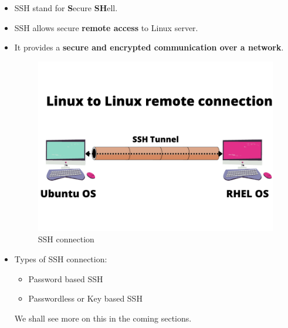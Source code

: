\setlength{\columnsep}{3pt}
\begin{flushleft}

\bigskip

\begin{itemize}
	\item SSH stand for \textbf{S}ecure \textbf{SH}ell.
	\item SSH allows secure \textbf{remote access} to Linux server.
	\item It provides a \textbf{secure and encrypted communication over a network}.
	
	\begin{figure}[h!]
		\centering
		\includegraphics[scale=0.45]{content/chapter19/images/ssh.png}
			\caption{SSH connection}
		\label{fig:boot1}
	\end{figure}

	\item Types of SSH connection:
	\begin{itemize}
		\item Password based SSH
		\item Passwordless or Key based SSH
	\end{itemize}
	
	We shall see more on this in the coming sections.
	
	
\end{itemize}
 


\end{flushleft}
\newpage


